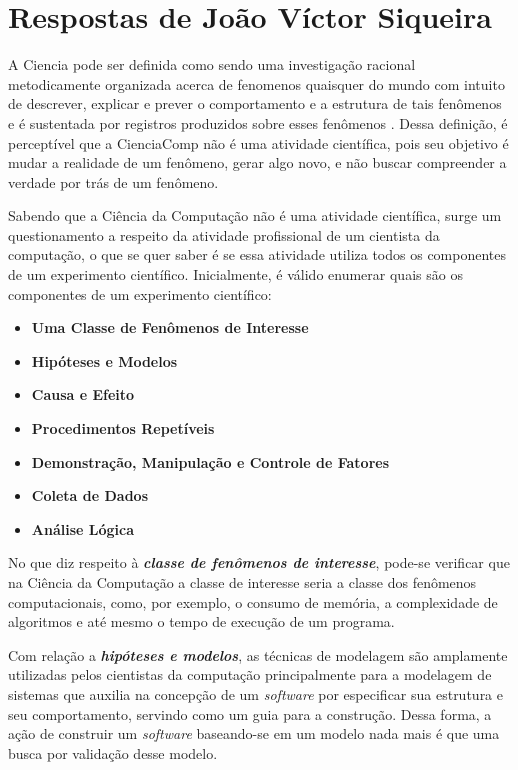 \section{Respostas de João Víctor Siqueira}

A \gls{Ciencia} pode ser definida como sendo uma investigação racional metodicamente organizada acerca de \gls{fenomeno}s quaisquer do mundo com intuito de descrever, explicar e prever o comportamento e a estrutura de tais fenômenos e é sustentada por registros produzidos sobre esses fenômenos \citep{fernandes_consideracoes_2021}. Dessa definição, é perceptível que a \gls{CienciaComp} não é uma atividade científica, pois seu objetivo é mudar a realidade de um fenômeno, gerar algo novo, e não buscar compreender a verdade por trás de um fenômeno.

Sabendo que a Ciência da Computação não é uma atividade científica, surge um questionamento a respeito da atividade profissional de um cientista da computação, o que se quer saber é se essa atividade utiliza todos os componentes de um experimento científico. Inicialmente, é válido enumerar quais são os componentes de um experimento científico: 

\begin{itemize}
    \item \textbf{Uma Classe de Fenômenos de Interesse}
    \item \textbf{Hipóteses e Modelos}
    \item \textbf{Causa e Efeito}
    \item \textbf{Procedimentos Repetíveis}
    \item \textbf{Demonstração, Manipulação e Controle de \gls{Fatores}}
    \item \textbf{Coleta de Dados}
    \item \textbf{Análise Lógica}
\end{itemize}

No que diz respeito à \textbf{\textit{classe de fenômenos de interesse}}, pode-se verificar que na Ciência da Computação a classe de interesse seria a classe dos fenômenos computacionais, como, por exemplo, o consumo de memória, a complexidade de algoritmos e até mesmo o tempo de execução de um programa.

Com relação a \textbf{\textit{hipóteses e modelos}}, as técnicas de modelagem são amplamente utilizadas pelos cientistas da computação principalmente para a modelagem de sistemas que auxilia na concepção de um \textit{software} por especificar sua estrutura e seu comportamento, servindo como um guia para a construção. Dessa forma, a ação de construir um \textit{software} baseando-se em um modelo nada mais é que uma busca por validação desse modelo.

